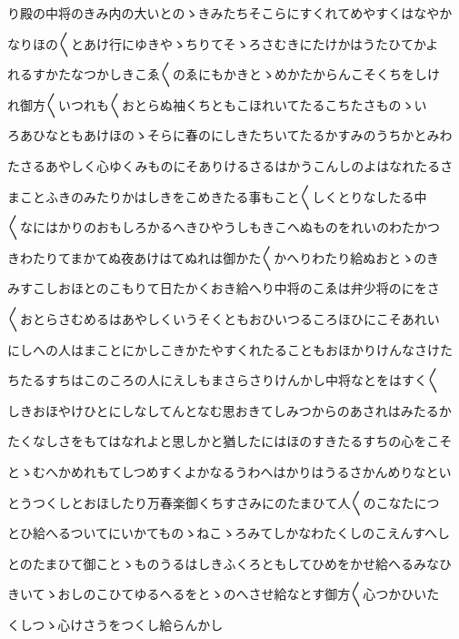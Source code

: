 \documentclass[a4paper,11pt,landscape]{ltjtarticle}
\begin{document}
\par\medskip
り殿の中将のきみ内の大いとのゝきみたちそこらにすくれてめやすくはなやか
\par\medskip
なりほの〱とあけ行にゆきやゝちりてそゝろさむきにたけかはうたひてかよ
\par\medskip
れるすかたなつかしきこゑ〱のゑにもかきとゝめかたからんこそくちをしけ
\par\medskip
れ御方〱いつれも〱おとらぬ袖くちともこほれいてたるこちたさものゝい
\par\medskip
ろあひなともあけほのゝそらに春のにしきたちいてたるかすみのうちかとみわ
\par\medskip
たさるあやしく心ゆくみものにそありけるさるはかうこんしのよはなれたるさ
\par\medskip
まことふきのみたりかはしきをこめきたる事もこと〱しくとりなしたる中
\par\medskip
〱なにはかりのおもしろかるへきひやうしもきこへぬものをれいのわたかつ
\par\medskip
きわたりてまかてぬ夜あけはてぬれは御かた〱かへりわたり給ぬおとゝのき
\par\medskip
みすこしおほとのこもりて日たかくおき給へり中将のこゑは弁少将のにをさ
\par\medskip
〱おとらさむめるはあやしくいうそくともおひいつるころほひにこそあれい
\par\medskip
にしへの人はまことにかしこきかたやすくれたることもおほかりけんなさけた
\par\medskip
ちたるすちはこのころの人にえしもまさらさりけんかし中将なとをはすく〱
\par\medskip
しきおほやけひとにしなしてんとなむ思おきてしみつからのあされはみたるか
\par\medskip
たくなしさをもてはなれよと思しかと猶したにはほのすきたるすちの心をこそ
\par\medskip
とゝむへかめれもてしつめすくよかなるうわへはかりはうるさかんめりなとい
\par\medskip
とうつくしとおほしたり万春楽御くちすさみにのたまひて人〱のこなたにつ
\par\medskip
とひ給へるついてにいかてものゝねこゝろみてしかなわたくしのこえんすへし
\par\medskip
とのたまひて御ことゝものうるはしきふくろともしてひめをかせ給へるみなひ
\par\medskip
きいてゝおしのこひてゆるへるをとゝのへさせ給なとす御方〱心つかひいた
\par\medskip
くしつゝ心けさうをつくし給らんかし
\par\medskip
\end{document}
